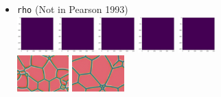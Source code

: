 \begin{itemize}
\item {\tt rho} (Not in Pearson 1993)\\
\includegraphics[height=1.4cm]{python_codes/fieldstone_171/pearson93_rand/rho_solution_0001000_u}
\includegraphics[height=1.4cm]{python_codes/fieldstone_171/pearson93_rand/rho_solution_0010000_u}
\includegraphics[height=1.4cm]{python_codes/fieldstone_171/pearson93_rand/rho_solution_0030000_u}
\includegraphics[height=1.4cm]{python_codes/fieldstone_171/pearson93_rand/rho_solution_0050000_u}
\includegraphics[height=1.4cm]{python_codes/fieldstone_171/pearson93_rand/rho_solution_final_u}\\
\includegraphics[height=1.4cm]{python_codes/fieldstone_171/images/munafo_rho1}
\includegraphics[height=1.4cm]{python_codes/fieldstone_171/images/munafo_rho2}


\end{itemize}
